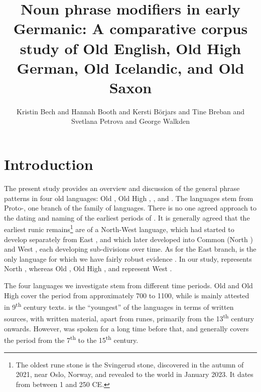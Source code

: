 \documentclass[output=paper,colorlinks,citecolor=brown,draft]{langscibook}
\title[Noun phrase modifiers in early Germanic languages] {Noun phrase modifiers in early Germanic: A comparative corpus study of Old English, Old High German, Old Icelandic, and Old Saxon}
\author{Kristin Bech\orcid{}\affiliation{University of Oslo} and Hannah Booth\orcid{}\affiliation{Ghent University} and Kersti Börjars\orcid{}\affiliation{University of Oxford} and Tine Breban\orcid{}\affiliation{The University of Manchester} and Svetlana Petrova\orcid{}\affiliation{Bergische Universität Wuppertal} and George Walkden\orcid{0000-0001-5950-9686}\affiliation{University of Konstanz}}
\begin{document}
\maketitle
{}
\section{Introduction}\label{intro}
The present study provides an overview and discussion of the general  phrase  patterns in four old  languages: Old , Old High , , and . The  languages stem from Proto-, one branch of the  family of languages. There is no one agreed approach to the dating and naming of the earliest periods of . It is generally agreed that the earliest runic remains\footnote{The oldest rune stone is the Svingerud stone, discovered in the autumn of 2021, near Oslo, Norway, and revealed to the world in January 2023. It dates from between 1 and 250 CE.} are of a North-West  language, which had started to develop separately from East , and which later developed into Common  (North ) and West , each developing sub-divisions over time. As for the East  branch,  is the only language for which we have fairly robust evidence \citep[with particular relevance to the topic of this chapter, see][]{ratkus2011}. In our study,  represents North , whereas Old , Old High , and  represent West . 

The four languages we investigate stem from different time periods. Old  and Old High  cover the period from approximately 700 to 1100, while  is mainly attested in 9\textsuperscript{th} century texts.  is the “youngest” of the languages in terms of written sources, with written material, apart from runes, primarily from the 13\textsuperscript{th} century onwards. However,  was spoken for a long time before that, and generally covers the period from the 7\textsuperscript{th} to the 15\textsuperscript{th} century. 
\end{document}
